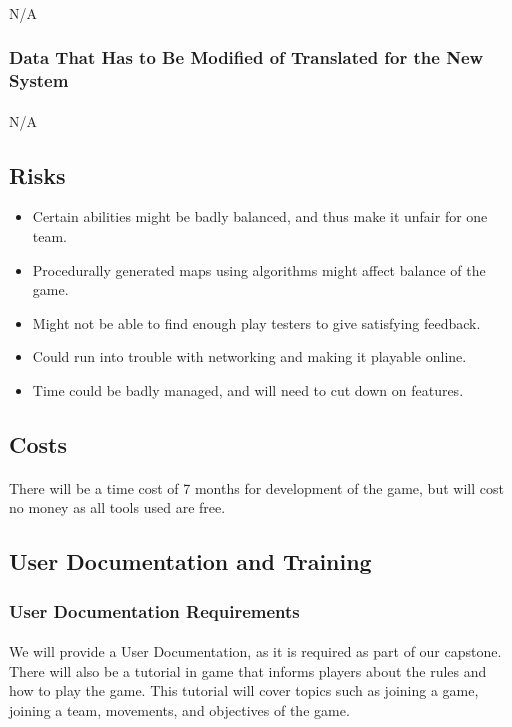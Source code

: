\documentclass[12pt, titlepage]{article}
\begin{document}
\paragraph{}N/A
\subsubsection{Data That Has to Be Modified of Translated for the New System}
\paragraph{}N/A
\subsection{Risks}
\begin{itemize}
    \item Certain abilities might be badly balanced, and thus make it unfair for one team.
    \item Procedurally generated maps using algorithms might affect balance of the game. 
    \item Might not be able to find enough play testers to give satisfying feedback.
    \item Could run into trouble with networking and making it playable online.
    \item Time could be badly managed, and will need to cut down on features.
\end{itemize}
\subsection{Costs}
\paragraph{}There will be a time cost of 7 months for development of the game, but will cost no money as all tools used are free.
\subsection{User Documentation and Training}
\subsubsection{User Documentation Requirements}
\paragraph{}We will provide a User Documentation, as it is required as part of our capstone. There will also be a tutorial in game that informs players about the rules and how to play the game. This tutorial will cover topics such as joining a game, joining a team, movements, and objectives of the game. 
\end{document}
